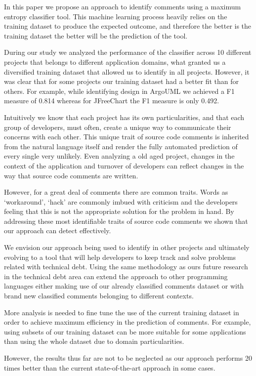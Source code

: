In this paper we propose an approach to identify \SATD comments using a maximum entropy classifier tool. This machine learning process heavily relies on the training dataset to produce the expected outcome, and therefore the better is the training dataset the better will be the prediction of the tool. 

During our study we analyzed the performance of the classifier across 10 different projects that belongs to different application domains, what granted us a diversified training dataset that allowed us to identify \SATD in all projects. However, it was clear that for some projects our training dataset had a better fit than for others. For example, while identifying design \SATD in ArgoUML we achieved a F1 measure of 0.814 whereas for JFreeChart the F1 measure is only 0.492. 

Intuitively we know that each project has its own particularities, and that each group of developers, must often, create a unique way to communicate their concerns with each other. This unique trait of source code comments is inherited from the natural language itself and render the fully automated prediction of every single \SATD very unlikely. Even analyzing a old aged project, changes in the context of the application and turnover of developers can reflect changes in the way that source code comments are written. 

However, for a great deal of \SATD comments there are common traits. Words as `workaround', `hack' are commonly imbued with criticism and the developers feeling that this is not the appropriate solution for the problem in hand. By addressing these most identifiable traits of source code comments we shown that our approach can detect \SATD effectively. 

We envision our approach being used to identify \SATD in other projects and ultimately evolving to a tool that will help developers to keep track and solve problems related with technical debt. Using the same methodology as ours future research in the technical debt area can extend the approach to other programming languages either making use of our already classified comments dataset or with brand new classified comments belonging to different contexts. 

More analysis is needed to fine tune the use of the current training dataset in order to achieve maximum efficiency in the prediction of \SATD comments. For example, using subsets of our training dataset can be more suitable for some applications than using the whole dataset due to domain particularities. 

However, the results thus far are not to be neglected as our approach performs 20 times better than the current state-of-the-art approach in some cases.